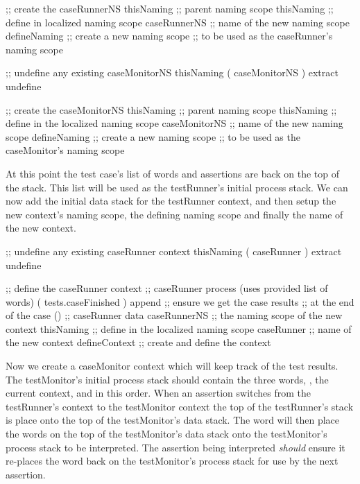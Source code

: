   ;; create the caseRunnerNS
  thisNaming   ;; parent naming scope
  thisNaming   ;; define in localized naming scope
  caseRunnerNS ;; name of the new naming scope
  defineNaming ;; create a new naming scope
               ;; to be used as the caseRunner's naming scope
\stopJoylolCode

\startJoylolCode
  ;; undefine any existing caseMonitorNS
  thisNaming
  ( caseMonitorNS ) extract
  undefine

  ;; create the caseMonitorNS
  thisNaming    ;; parent naming scope
  thisNaming    ;; define in the localized naming scope
  caseMonitorNS ;; name of the new naming scope
  defineNaming  ;; create a new naming scope
                ;; to be used as the caseMonitor's naming scope
\stopJoylolCode

At this point the test case's list of words and assertions are back on the 
top of the stack. This list will be used as the testRunner's initial 
process stack. We can now add the initial data stack for the testRunner 
context, and then setup the new context's naming scope, the defining 
naming scope and finally the name of the new context.

\startJoylolCode
  ;; undefine any existing caseRunner context
  thisNaming
  ( caseRunner ) extract
  undefine

  ;; define the caseRunner context
                ;; caseRunner process (uses provided list of words)
  ( tests.caseFinished )
  append        ;; ensure we get the case results
                ;; at the end of the case
  ()            ;; caseRunner data
  caseRunnerNS  ;; the naming scope of the new context
  thisNaming    ;; define in the localized naming scope
  caseRunner    ;; name of the new context
  defineContext ;; create and define the context
\stopJoylolCode

Now we create a caseMonitor context which will keep track of the test 
results. The testMonitor's initial process stack should contain the three 
words, , the current context, and  in this 
order. When an assertion switches from the testRunner's context to the 
testMonitor context the top of the testRunner's stack is place onto the 
top of the testMonitor's data stack. The  word will then 
place the words on the top of the testMonitor's data stack onto the 
testMonitor's process stack to be interpreted. The assertion being 
interpreted \emph{should} ensure it re-places the  word 
back on the testMonitor's process stack for use by the next assertion. 

